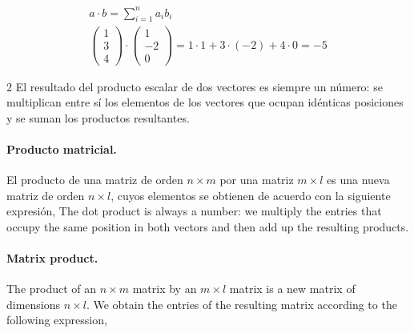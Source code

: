 \begin{gather*}
a\cdot b=\sum_{i=1}^na_ib_i\\
\begin{pmatrix}
1\\
3\\
4
\end{pmatrix}\cdot
\begin{pmatrix}
1\\
-2\\
0
\end{pmatrix}
=1\cdot 1+3 \cdot (-2)+ 4 \cdot 0= -5
\end{gather*}
\begin{paracol}{2}
El resultado del producto escalar de dos vectores es siempre un número: se multiplican entre sí los elementos de los vectores que ocupan idénticas posiciones y se suman los productos resultantes. 

\paragraph{Producto matricial.}
El producto de una matriz de orden $n\times m$ por una matriz $m\times l$ es una nueva matriz de orden $n\times l$, cuyos elementos se obtienen de acuerdo con la siguiente expresión,
\switchcolumn
The dot product is always a number: we multiply the entries that occupy the same position in both vectors and then add up the resulting products. 

\paragraph{Matrix product.} The product of an $n \times m$ matrix by an $m\times l$ matrix is a new matrix of dimensions $n\times l$. We obtain the entries of the resulting matrix according to the following expression,    
\end{paracol}


